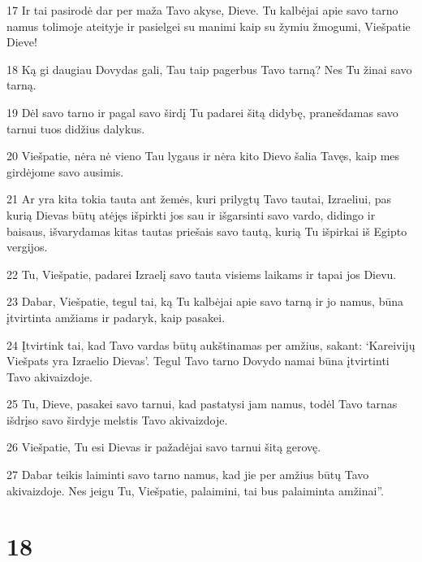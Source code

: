 \par 17 Ir tai pasirodė dar per maža Tavo akyse, Dieve. Tu kalbėjai apie savo tarno namus tolimoje ateityje ir pasielgei su manimi kaip su žymiu žmogumi, Viešpatie Dieve! 
\par 18 Ką gi daugiau Dovydas gali, Tau taip pagerbus Tavo tarną? Nes Tu žinai savo tarną. 
\par 19 Dėl savo tarno ir pagal savo širdį Tu padarei šitą didybę, pranešdamas savo tarnui tuos didžius dalykus. 
\par 20 Viešpatie, nėra nė vieno Tau lygaus ir nėra kito Dievo šalia Tavęs, kaip mes girdėjome savo ausimis. 
\par 21 Ar yra kita tokia tauta ant žemės, kuri prilygtų Tavo tautai, Izraeliui, pas kurią Dievas būtų atėjęs išpirkti jos sau ir išgarsinti savo vardo, didingo ir baisaus, išvarydamas kitas tautas priešais savo tautą, kurią Tu išpirkai iš Egipto vergijos. 
\par 22 Tu, Viešpatie, padarei Izraelį savo tauta visiems laikams ir tapai jos Dievu. 
\par 23 Dabar, Viešpatie, tegul tai, ką Tu kalbėjai apie savo tarną ir jo namus, būna įtvirtinta amžiams ir padaryk, kaip pasakei. 
\par 24 Įtvirtink tai, kad Tavo vardas būtų aukštinamas per amžius, sakant: ‘Kareivijų Viešpats yra Izraelio Dievas’. Tegul Tavo tarno Dovydo namai būna įtvirtinti Tavo akivaizdoje. 
\par 25 Tu, Dieve, pasakei savo tarnui, kad pastatysi jam namus, todėl Tavo tarnas išdrįso savo širdyje melstis Tavo akivaizdoje. 
\par 26 Viešpatie, Tu esi Dievas ir pažadėjai savo tarnui šitą gerovę. 
\par 27 Dabar teikis laiminti savo tarno namus, kad jie per amžius būtų Tavo akivaizdoje. Nes jeigu Tu, Viešpatie, palaimini, tai bus palaiminta amžinai”.



\chapter{18}


